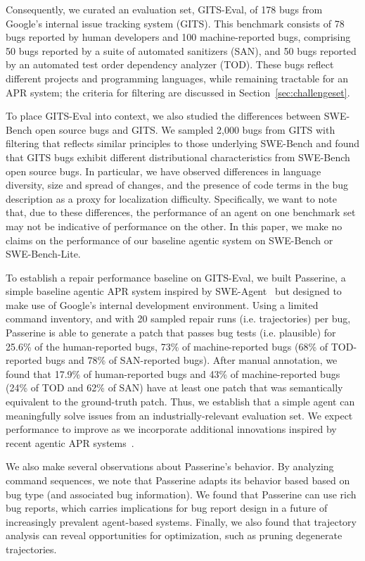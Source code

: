 Consequently, we curated an evaluation set, GITS-Eval, of 178 bugs from Google's internal issue tracking system (GITS). 
This benchmark consists of 78 bugs reported by human developers and 100 machine-reported bugs, comprising 50 bugs reported by a suite of automated sanitizers (SAN), and 50 bugs reported by an automated test order dependency analyzer (TOD). These bugs reflect
different projects and programming languages, while remaining tractable for an APR system; the criteria for filtering are discussed in Section~\ref{sec:challengeset}.


To place GITS-Eval into context,  we also studied the differences
between SWE-Bench open source bugs and GITS. We sampled
2,000 bugs from GITS with filtering that reflects similar principles
to those underlying SWE-Bench and
found that GITS bugs exhibit different distributional characteristics from SWE-Bench open source bugs. In particular, we have observed differences in language diversity, size and spread of changes, and the presence of code terms in the bug description as a proxy for localization difficulty.
Specifically, we want to note that, due to these differences, the performance of an agent on one benchmark set may not be indicative of performance on the other.
In this paper, we make no claims on the performance of our baseline agentic system on SWE-Bench or SWE-Bench-Lite.

To establish a repair performance baseline on GITS-Eval, we built Passerine, a simple baseline agentic APR system inspired by SWE-Agent~\cite{sweagent} but designed to make use of Google’s internal development environment.
Using a limited command inventory, and with 20 sampled repair
runs (i.e. trajectories) per bug, Passerine is able to generate a
patch that passes bug tests (i.e. plausible) for 
25.6\% of the human-reported bugs, 73\% of machine-reported bugs (68\% of TOD-reported bugs and 78\% of SAN-reported bugs).
After manual annotation, we found that 17.9\% of human-reported bugs and 43\% of machine-reported bugs (24\% of TOD and 62\% of SAN) have at least one patch that was semantically equivalent to the ground-truth patch.
Thus, we establish that a simple agent can meaningfully solve issues from an industrially-relevant evaluation set. We expect
performance to improve as we
incorporate additional innovations
inspired by recent agentic
APR systems~\cite{specrover, autocoderover, codeR, marscode}.

We also make several observations about Passerine's behavior.
By analyzing command sequences, we note that Passerine adapts its behavior based
based on bug type (and associated bug information).
We found that Passerine can use rich bug reports, which carries implications for
bug report design in a future of increasingly prevalent agent-based systems.
Finally, we also found that trajectory analysis can reveal opportunities
for optimization, such as pruning degenerate trajectories.


















